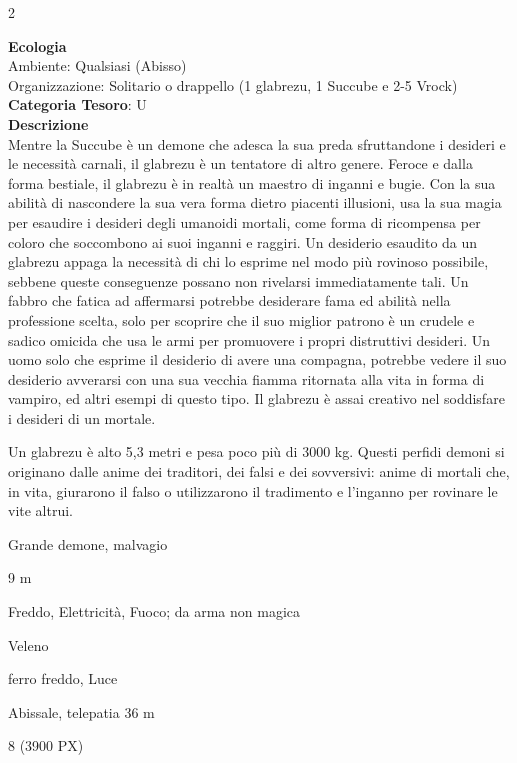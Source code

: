 \begin{multicols}{2}
{\textbf{Ecologia}\\
Ambiente: Qualsiasi (Abisso)\\
Organizzazione: Solitario o drappello (1 glabrezu, 1 Succube e 2-5 Vrock)
\textbf{Categoria Tesoro}: U\\
\textbf{Descrizione}\\
Mentre la Succube è un demone che adesca la sua preda sfruttandone i desideri e le necessità carnali, il glabrezu è un tentatore di altro genere. Feroce e dalla forma bestiale, il glabrezu è in realtà un maestro di inganni e bugie. Con la sua abilità di nascondere la sua vera forma dietro piacenti illusioni, usa la sua magia per esaudire i desideri degli umanoidi mortali, come forma di ricompensa per coloro che soccombono ai suoi inganni e raggiri. Un desiderio esaudito da un glabrezu appaga la necessità di chi lo esprime nel modo più rovinoso possibile, sebbene queste conseguenze possano non rivelarsi immediatamente tali. Un fabbro che fatica ad affermarsi potrebbe desiderare fama ed abilità nella professione scelta, solo per scoprire che il suo miglior patrono è un crudele e sadico omicida che usa le armi per promuovere i propri distruttivi desideri. Un uomo solo che esprime il desiderio di avere una compagna, potrebbe vedere il suo desiderio avverarsi con una sua vecchia fiamma ritornata alla vita in forma di vampiro, ed altri esempi di questo tipo. Il glabrezu è assai creativo nel soddisfare i desideri di un mortale.

Un glabrezu è alto 5,3 metri e pesa poco più di 3000 kg. Questi perfidi demoni si originano dalle anime dei traditori, dei falsi e dei sovversivi: anime di mortali che, in vita, giurarono il falso o utilizzarono il tradimento e l'inganno per rovinare le vite altrui.

\begin{description}[noitemsep, topsep=0pt, parsep=0pt, partopsep=0pt, itemsep=1pt, leftmargin=2.35cm,  labelwidth=2.2cm, itemindent=0cm, listparindent=0pt] %
\setlength{\baselineskip}{10pt}
\item[\textbf{Taglia/Tipo}] Grande demone, malvagio
\item[\textbf{Caratt.}] 
\item[\textbf{Punti Ferita}] 
\item[\textbf{Movimento}] 9 m
\item[\textbf{Tiri Salvez.}] 
\item[\textbf{Res. Danni}] Freddo, Elettricità, Fuoco; da arma non magica
\item[\textbf{Imm. Danni}] Veleno
\item[\textbf{Vulnerabilità}] ferro freddo, Luce
\item[\textbf{Sensi}] 
\item[\textbf{Linguaggi}] Abissale, telepatia 36 m
\item[\textbf{Sfida}] 8 (3900 PX)
\end{description}
\smallskip

}
\end{multicols}

